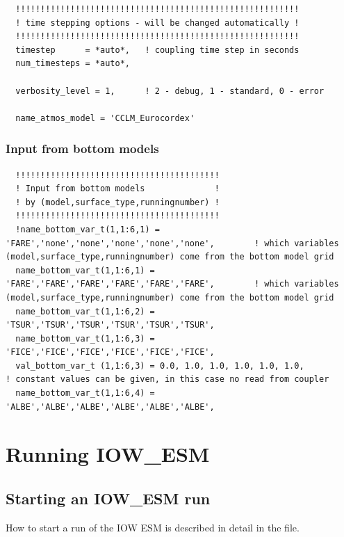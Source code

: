 \documentclass[a4paper,titlepage]{scrartcl}
\begin{document}
\begin{verbatim}
  !!!!!!!!!!!!!!!!!!!!!!!!!!!!!!!!!!!!!!!!!!!!!!!!!!!!!!!!!
  ! time stepping options - will be changed automatically !
  !!!!!!!!!!!!!!!!!!!!!!!!!!!!!!!!!!!!!!!!!!!!!!!!!!!!!!!!!
  timestep      = *auto*,   ! coupling time step in seconds
  num_timesteps = *auto*,
  
  verbosity_level = 1,		! 2 - debug, 1 - standard, 0 - error
  
  name_atmos_model = 'CCLM_Eurocordex'
\end{verbatim}

\subsubsection{Input from bottom models}

\begin{verbatim}
  !!!!!!!!!!!!!!!!!!!!!!!!!!!!!!!!!!!!!!!!!
  ! Input from bottom models              !
  ! by (model,surface_type,runningnumber) !
  !!!!!!!!!!!!!!!!!!!!!!!!!!!!!!!!!!!!!!!!!
  !name_bottom_var_t(1,1:6,1) = 'FARE','none','none','none','none','none',        ! which variables (model,surface_type,runningnumber) come from the bottom model grid
  name_bottom_var_t(1,1:6,1) = 'FARE','FARE','FARE','FARE','FARE','FARE',        ! which variables (model,surface_type,runningnumber) come from the bottom model grid
  name_bottom_var_t(1,1:6,2) = 'TSUR','TSUR','TSUR','TSUR','TSUR','TSUR',  
  name_bottom_var_t(1,1:6,3) = 'FICE','FICE','FICE','FICE','FICE','FICE',
  val_bottom_var_t (1,1:6,3) = 0.0, 1.0, 1.0, 1.0, 1.0, 1.0,                     ! constant values can be given, in this case no read from coupler
  name_bottom_var_t(1,1:6,4) = 'ALBE','ALBE','ALBE','ALBE','ALBE','ALBE',
\end{verbatim}


\newpage
\section{Running IOW\_ESM}
\subsection{Starting an IOW\_ESM run}

How to start a run of the IOW ESM is described in detail in the \Readme file.
\end{document}
